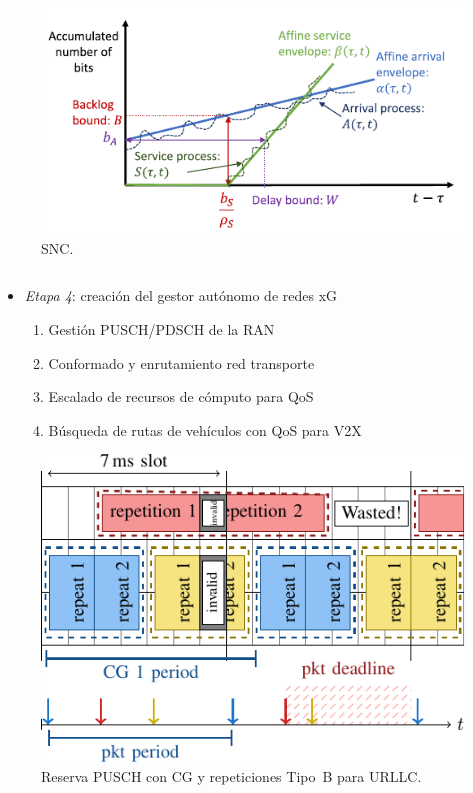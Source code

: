 \documentclass[xcolor=table,xcolor=x11names]{beamer}
\begin{document}
\begin{frame}{\subsecname}
\begin{columns}[T]
\begin{column}{.48\textwidth}
            \vspace{2em}


            \begin{figure}[t]
                \centering
                \includegraphics[width=.8\textwidth]{figures/snc.pdf}
                \vspace{-.5em}
                \caption{SNC.}
            \end{figure}
        \end{column}
    \end{columns}
\end{frame}




\begin{frame}{\subsecname}
    \begin{itemize}
        \item \emph{Etapa 4}: creación del gestor autónomo de redes xG
            \begin{enumerate}
                \item Gestión PUSCH/PDSCH de la RAN
                \item Conformado y enrutamiento
                    red transporte
                \item Escalado de recursos de cómputo para QoS
                \item Búsqueda de rutas de vehículos con QoS para V2X
            \end{enumerate}
    \end{itemize}



\begin{figure}
    \centering
    \includegraphics[width=.4\textwidth]{figures/configured-grant-repetitions.pdf}
    \caption{Reserva PUSCH con CG y repeticiones Tipo~B
    para URLLC.}
\end{figure}
\end{frame}
\end{document}
